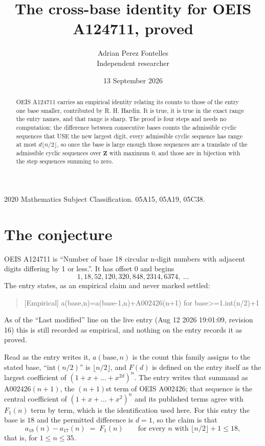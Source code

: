 \documentclass[11pt,a4paper]{article}
\title{The cross-base identity for OEIS A124711, proved}
\author{Adrian Perez Fontelles\\ \small Independent researcher}
\date{13 September 2026}
\theoremstyle{plain}
\theoremstyle{definition}
\begin{document}
\maketitle

\begin{abstract}
OEIS A124711 carries an empirical identity relating its counts to those of the entry one base
smaller, contributed by R. H. Hardin. It is true, it is true in the exact range the entry
names, and that range is sharp. The proof is four steps and needs no computation: the
difference between consecutive bases counts the admissible cyclic sequences that USE the new
largest digit, every admissible cyclic sequence has range at most $d\lfloor n/2\rfloor$, so
once the base is large enough those sequences are a translate of the admissible cyclic
sequences over $\mathbf{Z}$ with maximum $0$, and those are in bijection with the step
sequences summing to zero.
\end{abstract}

\noindent\small 2020 Mathematics Subject Classification. 05A15, 05A19, 05C38.\normalsize

\section{The conjecture}

OEIS A124711 is ``Number of base 18 circular n-digit numbers with adjacent digits differing by 1 or less.''. It has offset $0$ and begins
\[
1, 18, 52, 120, 320, 848, 2314, 6374,\ \dots
\]
The entry states, as an empirical claim and never marked settled:
\begin{quote}
[Empirical] a(base,n)=a(base-1,n)+A002426(n+1) for base>=1.int(n/2)+1
\end{quote}
As of the ``Last modified'' line on the live entry (Aug 12 2026 19:01:09, revision 16)
this is still recorded as empirical, and nothing on the entry records it as proved.

Read as the entry writes it, $a(\mathrm{base},n)$ is the count this family assigns to the
stated base, ``$\mathrm{int}(n/2)$'' is $\lfloor n/2\rfloor$, and $F(d)$ is defined on the
entry itself as the largest coefficient of $(1+x+\dots+x^{2d})^{n}$. The entry writes that summand as $\mathrm{A002426}(n+1)$, the $(n+1)$st term of OEIS A002426; that sequence is the central coefficient of $(1+x+\dots+x^{2})^{n}$ and its published terms agree with $F_{1}(n)$ term by term, which is the identification used here. For this entry
the base is $18$ and the permitted difference is $d=1$, so the claim is that
\[
a_{18}(n)-a_{17}(n)\;=\;F_{1}(n)
\qquad\text{for every } n \text{ with } \lfloor n/2\rfloor+1\le18,
\]
that is, for $1\le n\le35$.
\end{document}

